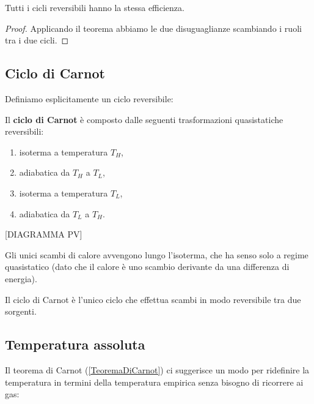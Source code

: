 \begin{corollary}\label{CicliReversibiliHannoLaStessaEfficienza}
Tutti i cicli reversibili hanno la stessa efficienza.
\end{corollary}
\begin{proof}
Applicando il teorema abbiamo le due disuguaglianze scambiando i ruoli tra i due cicli.
\end{proof}


\subsection{Ciclo di Carnot}
Definiamo esplicitamente un ciclo reversibile:

\begin{definition}
Il \textbf{ciclo di Carnot} \`e composto dalle seguenti trasformazioni quasistatiche reversibili:
\begin{enumerate}
\item isoterma a temperatura $T_H$,
\item adiabatica da $T_H$ a $T_L$, 
\item isoterma a temperatura $T_L$,
\item adiabatica da $T_L$ a $T_H$.
\end{enumerate}
[DIAGRAMMA PV]
\end{definition}


\begin{remark}
Gli unici scambi di calore avvengono lungo l'isoterma, che ha senso solo a regime quasistatico (dato che il calore \`e uno scambio derivante da una differenza di energia).
\end{remark}

\begin{fact}
Il ciclo di Carnot \`e l'unico ciclo che effettua scambi in modo reversibile tra due sorgenti.
\end{fact}

\subsection{Temperatura assoluta}
Il teorema di Carnot (\ref{TeoremaDiCarnot}) ci suggerisce un modo per ridefinire la temperatura in termini della temperatura empirica senza bisogno di ricorrere ai gas:
\medskip

